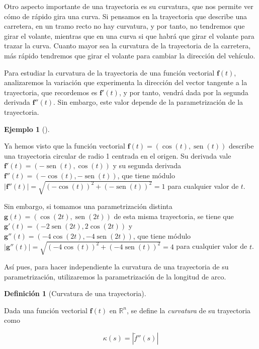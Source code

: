 \documentclass[
  a4paper,
]{scrreport}
\theoremstyle{definition}
\newtheorem{definition}{Definición}[chapter]
\theoremstyle{plain}
\theoremstyle{plain}
\theoremstyle{definition}
\theoremstyle{definition}
\newtheorem{example}{Ejemplo}[chapter]
\theoremstyle{plain}
\theoremstyle{remark}
\begin{document}
Otro aspecto importante de una trayectoria es su curvatura, que nos
permite ver cómo de rápido gira una curva. Si pensamos en la trayectoria
que describe una carretera, en un tramo recto no hay curvatura, y por
tanto, no tendremos que girar el volante, mientras que en una curva si
que habrá que girar el volante para trazar la curva. Cuanto mayor sea la
curvatura de la trayectoria de la carretera, más rápido tendremos que
girar el volante para cambiar la dirección del vehículo.

Para estudiar la curvatura de la trayectoria de una función vectorial
\(\mathbf{f}(t)\), analizaremos la variación que experimenta la
dirección del vector tangente a la trayectoria, que recordemos es
\(\mathbf{f}'(t)\), y por tanto, vendrá dada por la segunda derivada
\(\mathbf{f}''(t)\). Sin embargo, este valor depende de la
parametrización de la trayectoria.

\begin{example}[]\protect\hypertarget{exm-curvatura-dependiente-parametrizacion}{}\label{exm-curvatura-dependiente-parametrizacion}

Ya hemos visto que la función vectorial
\(\mathbf{f}(t)=(\cos(t),\operatorname{sen}(t))\) describe una
trayectoria circular de radio 1 centrada en el origen. Su derivada vale
\(\mathbf{f}'(t)=(-\operatorname{sen}(t),\cos(t))\) y su segunda
derivada \(\mathbf{f}''(t)=(-\cos(t),-\operatorname{sen}(t))\), que
tiene módulo
\(|\mathbf{f}''(t)| = \sqrt{(-\cos(t))^2+(-\operatorname{sen}(t))^2} = 1\)
para cualquier valor de \(t\).

Sin embargo, si tomamos una parametrización distinta
\(\mathbf{g}(t)=(\cos(2t), \operatorname{sen}(2t))\) de esta misma
trayectoria, se tiene que
\(\mathbf{g}'(t)=(-2\operatorname{sen}(2t),2\cos(2t))\) y
\(\mathbf{g}''(t)=(-4\cos(2t), -4\operatorname{sen}(2t))\), que tiene
módulo
\(|\mathbf{g}''(t)| = \sqrt{(-4\cos(t))^2+(-4\operatorname{sen}(t))^2} = 4\)
para cualquier valor de \(t\).

\end{example}

Así pues, para hacer independiente la curvatura de una trayectoria de su
parametrización, utilizaremos la parametrización de la longitud de arco.

\begin{definition}[Curvatura de una
trayectoria]\protect\hypertarget{def-curvatura-trayectoria}{}\label{def-curvatura-trayectoria}

Dada una función vectorial \(\mathbf{f}(t)\) en \(\mathbb{R}^n\), se
define la \emph{curvatura} de su trayectoria como

\[
\kappa(s) = |\tilde{f}''(s)|
\]

\end{definition}
\end{document}
